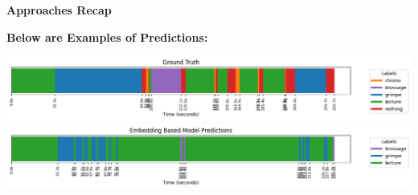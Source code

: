 \begin{frame}
    \textbf{Approaches Recap}

    \vspace{0.5em}

    

    \vspace{0.5em}
    
    \textbf{Below are Examples of Predictions:}

    \vspace{0.5em}

    \centering
    \includegraphics[width=\textwidth]{assets/visuals/segmentation-ground-truth.png}
    \includegraphics[width=\textwidth]{assets/visuals/predictions-example.png}
\end{frame}